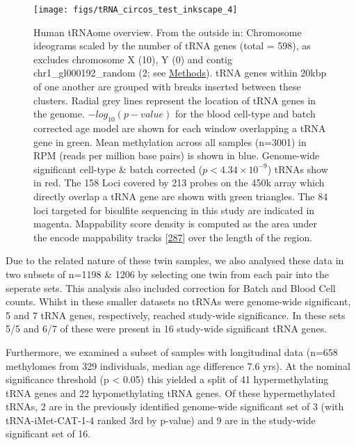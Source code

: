\documentclass[
]{book}
\begin{document}
\begin{figure}

{\centering \texttt{[image: figs/tRNA\_circos\_test\_inkscape\_4]} 

}

\caption{Human tRNAome overview. From the outside in: Chromosome ideograms scaled by the number of tRNA genes (total = 598), as excludes chromosome X (10), Y (0) and contig chr1\_gl000192\_random (2; see \protect\hyperlink{tRNAanno}{Methods}). tRNA genes within 20kbp of one another are grouped with breaks inserted between these clusters. Radial grey lines represent the location of tRNA genes in the genome. \(-log_{10}(p-value)\) for the blood cell-type and batch corrected age model are shown for each window overlapping a tRNA gene in green. Mean methylation across all samples (n=3001) in RPM (reads per million base pairs) is shown in blue. Genome-wide significant cell-type \& batch corrected (\(p < 4.34\times10^{-9}\)) tRNAs show in red. The 158 Loci covered by 213 probes on the 450k array which directly overlap a tRNA gene are shown with green triangles. The 84 loci targeted for bisulfite sequencing in this study are indicated in magenta. Mappability score density is computed as the area under the encode mappability tracks {[}\protect\hyperlink{ref-Derrien2012}{287}{]} over the length of the region.}\label{fig:circos}
\end{figure}



Due to the related nature of these twin samples, we also analysed these data in two subsets of n=1198 \& 1206 by selecting one twin from each pair into the seperate sets.
This analysis also included correction for Batch and Blood Cell counts.
Whilst in these smaller datasets no tRNAs were genome-wide significant, 5 and 7 tRNA genes, respectively, reached study-wide significance.
In these sets 5/5 and 6/7 of these were present in 16 study-wide significant tRNA genes.

Furthermore, we examined a subset of samples with longitudinal data (n=658 methylomes from 329 individuals, median age difference 7.6 yrs).
At the nominal significance threshold (p \textless{} 0.05) this yielded a split of 41 hypermethylating tRNA genes and 22 hypomethylating tRNA genes.
Of these hypermethylated tRNAs, 2 are in the previously identified genome-wide significant set of 3 (with tRNA-iMet-CAT-1-4 ranked 3rd by p-value) and 9 are in the study-wide significant set of 16.
\end{document}

